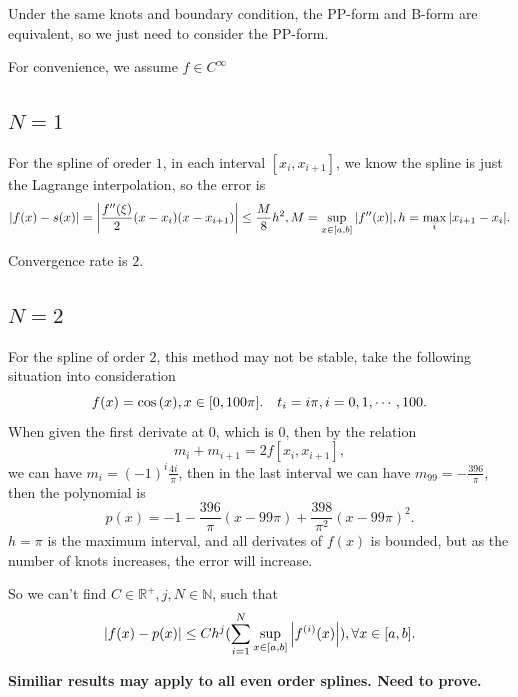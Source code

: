 \documentclass[a4paper]{article}
\begin{document}
Under the same knots and boundary condition, the PP-form and B-form are equivalent,
so we just need to consider the PP-form.

For convenience, we assume $f \in C^{\infty}$

\subsection{$N=1$}
For the spline of oreder $1$, in each interval $[x_i, x_{i+1}]$, we know the spline is just the Lagrange interpolation,
so the error is 
\begin{equation}
    \abs{f(x) - s(x)} = \abs{\frac{f^{\prime \prime} (\xi)}{2} (x-x_i)(x-x_{i+1}) } \leq \frac{M}{8} h^2, M = \sup_{x \in [a,b]} \abs{f^{\prime \prime}(x)}, h = \max_{i} \abs{x_{i+1} - x_i}.
\end{equation}

Convergence rate is $2$.

\subsection{$N=2$}
For the spline of order $2$, this method may not be stable, take the following situation into consideration
\begin{equation}
    f(x) = \cos\qty(x), x \in [0, 100 \pi]. \quad
    t_i = i \pi, i = 0, 1, \cdots, 100.
\end{equation}
When given the first derivate at $0$, which is $0$, then by the relation
\begin{equation}
    m_i + m_{i+1} = 2 f[x_i, x_{i+1}],
\end{equation}
we can have $m_i = (-1)^i \frac{4 i}{\pi}$, then in the last interval we can have 
$m_{99} = -\frac{396}{\pi}$, then the polynomial is 
\begin{equation}
    p(x) = -1 - \frac{396}{\pi}(x-99 \pi) + \frac{398}{\pi^2}(x-99 \pi)^2.
\end{equation}
$h = \pi$ is the maximum interval, and all derivates of $f(x)$ is bounded, but as the number of knots increases, the error will increase.

So we can't find $C\in \mathbb{R}^{+}, j, N\in \mathbb{N}$, such that 
\begin{equation}
    \abs{f(x) - p(x)} \leq C h^j (\sum_{i=1}^{N} \sup_{x \in [a,b]} \abs{f^{(i)}(x)}), \forall x \in [a,b].
\end{equation}

\textbf{Similiar results may apply to all even order splines. Need to prove.}
\end{document}
